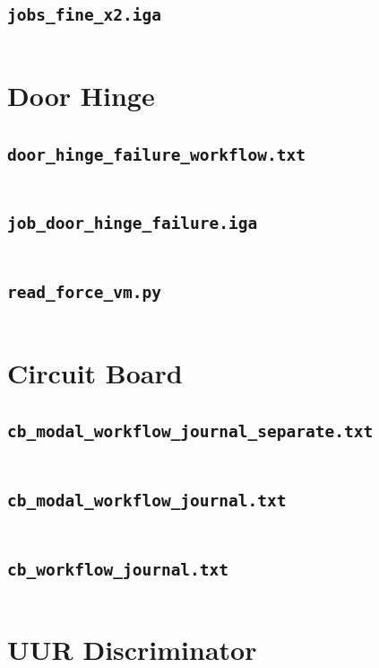 \documentclass[12pt,report,justified]{SANDreport}
\begin{document}
\subsection{\tt{jobs\_fine\_x2.iga}}
\inputminted[stripnl=false]{json}{cframe_modal/jobs_fine_x2.json}

\section{Door Hinge}

\subsection{\tt{door\_hinge\_failure\_workflow.txt}}
\inputminted[stripnl=false]{text}{door_hinge/door_hinge_failure_workflow.txt}

\subsection{\tt{job\_door\_hinge\_failure.iga}}
\inputminted[stripnl=false]{json}{door_hinge/job_door_hinge_failure.json}

\subsection{\tt{read\_force\_vm.py}}
\inputminted[stripnl=false]{python}{door_hinge/read_force_vm.py}

\section{Circuit Board}

\subsection{\tt{cb\_modal\_workflow\_journal\_separate.txt}}
\inputminted[stripnl=false]{text}{circuit_board/cb_modal_workflow_journal_separate.txt}

\subsection{\tt{cb\_modal\_workflow\_journal.txt}}
\inputminted[stripnl=false]{text}{circuit_board/cb_modal_workflow_journal.txt}

\subsection{\tt{cb\_workflow\_journal.txt}}
\inputminted[stripnl=false]{text}{circuit_board/cb_workflow_journal.txt}

\section{UUR Discriminator}
\end{document}

